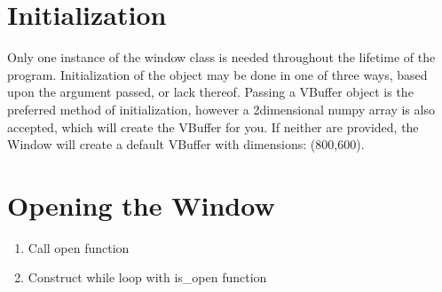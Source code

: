 \documentclass[letterpaper,10pt,english]{sphinxmanual}
\begin{document}
\section{Initialization}
\label{\detokenize{fundamentals:id1}}
\sphinxAtStartPar
Only one instance of the window class is needed throughout the lifetime of the program. Initialization of the object may be done in one of three ways, based upon the argument passed, or lack thereof. Passing a VBuffer object is the preferred method of initialization, however a 2\sphinxhyphen{}dimensional numpy array is also accepted, which will create the VBuffer for you. If neither are provided, the Window will create a default VBuffer with dimensions: (800,600).
\def\sphinxLiteralBlockLabel{\label{\detokenize{fundamentals:id12}}}
\begin{sphinxVerbatim}[commandchars=\\\{\}]
   
   
\end{sphinxVerbatim}
\def\sphinxLiteralBlockLabel{\label{\detokenize{fundamentals:id13}}}
\begin{sphinxVerbatim}[commandchars=\\\{\}]
   
   
\end{sphinxVerbatim}
\def\sphinxLiteralBlockLabel{\label{\detokenize{fundamentals:id14}}}
\begin{sphinxVerbatim}[commandchars=\\\{\}]
   
\end{sphinxVerbatim}


\section{Opening the Window}
\label{\detokenize{fundamentals:opening-the-window}}\begin{enumerate}
%
\item {} 
\sphinxAtStartPar
Call open function

\item {} 
\sphinxAtStartPar
Construct while loop with is\_open function

\end{enumerate}
\end{document}
